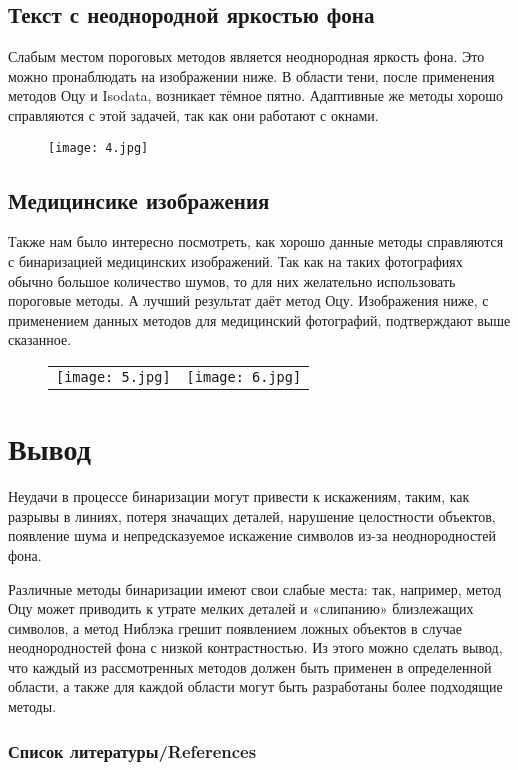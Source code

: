 \documentclass[a4paper,12pt]{article}
\begin{document}
\subsection*{Текст с неоднородной яркостью фона}
Слабым местом пороговых методов является неоднородная яркость фона. Это можно пронаблюдать на изображении ниже. В области тени, после применения методов Оцу и Isodata, возникает тёмное пятно. Адаптивные же методы хорошо справляются с этой задачей, так как они работают с окнами.
\begin{figure}[h!]
    \centering	
    \texttt{[image: 4.jpg]}
    \label{1_1}
\end{figure}

\subsection*{Медицинсике изображения}
Также нам было интересно посмотреть, как хорошо данные методы справляются с бинаризацией медицинских изображений. Так как на таких фотографиях обычно большое количество шумов, то для  них желательно использовать пороговые методы. А лучший результат даёт метод Оцу. Изображения ниже, с применением данных методов для медицинский фотографий, подтверждают выше сказанное.
\begin{figure}[h!]\centering
\begin{tabular}{cc}
\texttt{[image: 5.jpg]}
&
\texttt{[image: 6.jpg]}
\end{tabular}
\end{figure}

\section{Вывод}
Неудачи в процессе бинаризации могут привести к искажениям, таким, как разрывы в
линиях, потеря значащих деталей, нарушение целостности объектов, появление шума и
непредсказуемое искажение символов из-за неоднородностей фона.

Различные методы бинаризации имеют свои слабые места: так, например, метод Оцу может
приводить к утрате мелких деталей и «слипанию» близлежащих символов, а метод Ниблэка
грешит появлением ложных объектов в случае неоднородностей фона с низкой
контрастностью. Из этого можно сделать вывод, что каждый из рассмотренных методов должен
быть применен в определенной области, а также для каждой области могут быть разработаны
более подходящие методы.
\newpage
\begin{center}
    \subsubsection*{{Список литературы/References}}
\end{center}
\end{document}
